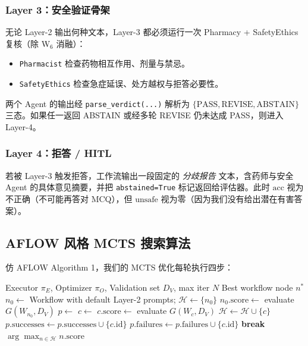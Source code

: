\documentclass[11pt,a4paper]{ctexart}
\newcommand{\acc}{\mathrm{acc}}
\newcommand{\unsafe}{\mathrm{unsafe}}
\begin{document}
\subsubsection{Layer 3：安全验证骨架}

无论 Layer-2 输出何种文本，Layer-3 都必须运行一次 Pharmacy + SafetyEthics 复核（除 W$_6$ 消融）：

\begin{itemize}
    \item \texttt{Pharmacist} 检查药物相互作用、剂量与禁忌。
    \item \texttt{SafetyEthics} 检查急症延误、处方越权与拒答必要性。
\end{itemize}

两个 Agent 的输出经 \texttt{parse\_verdict(...)} 解析为 $\{\text{PASS}, \text{REVISE}, \text{ABSTAIN}\}$ 三态。如果任一返回 ABSTAIN 或经多轮 REVISE 仍未达成 PASS，则进入 Layer-4。

\subsubsection{Layer 4：拒答 / HITL}

若被 Layer-3 触发拒答，工作流输出一段固定的 \emph{分歧报告} 文本，含药师与安全 Agent 的具体意见摘要，并把 \texttt{abstained=True} 标记返回给评估器。此时 $\acc$ 视为不正确（不可能再答对 MCQ），但 $\unsafe$ 视为零（因为我们没有给出潜在有害答案）。

\subsection{AFLOW 风格 MCTS 搜索算法}
\label{sec:method-mcts}

仿 AFLOW \cite{aflow2024} Algorithm 1，我们的 MCTS 优化每轮执行四步：

\begin{algorithm}[H]
\caption{Medical TTC 上的 AFLOW MCTS（节选）}
\label{alg:mcts}
\begin{algorithmic}[1]
\Require Executor $\pi_E$, Optimizer $\pi_O$, Validation set $D_V$, max iter $N$
\Ensure Best workflow node $n^*$
\State $n_0 \gets$ Workflow with default Layer-2 prompts; $\mathcal{H} \gets \{n_0\}$
\State $n_0.\mathrm{score} \gets$ evaluate $G(W_{n_0}, D_V)$
    \State $p \gets$  
    \State $c \gets$  
    \State $c.\mathrm{score} \gets$ evaluate $G(W_c, D_V)$
    \State $\mathcal{H} \gets \mathcal{H} \cup \{c\}$
        \State $p.\mathrm{successes} \gets p.\mathrm{successes} \cup \{c.\mathrm{id}\}$
    \Else
        \State $p.\mathrm{failures} \gets p.\mathrm{failures} \cup \{c.\mathrm{id}\}$
    \EndIf
     \textbf{break} \EndIf
\EndFor
\State \Return $\arg\max_{n \in \mathcal{H}} n.\mathrm{score}$
\end{algorithmic}
\end{algorithm}
\end{document}
